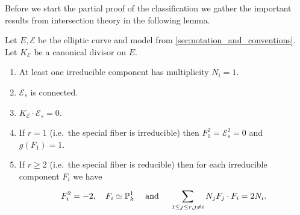 Before we start the partial proof of the classification we gather the important results from intersection theory in the following lemma. 
\begin{lemma}
	\label{prop:irred_comp_of_prop_model}
	Let $E, \mathscr E$ be the elliptic curve and model from \cref{sec:notation_and_conventions}. 
	Let $K_{\mathscr E}$ be a canonical divisor on $E$. 
	\begin{enumerate}
		\item At least one irreducible component has multiplicity $N_i = 1$.  
		\item $\mathscr E_s$ is connected. 
		\item $K_{\mathscr E} \cdot \mathscr E_s = 0 $. 
		\item If $r = 1$ (i.e.\ the special fiber is irreducible) then $F_1^2 = \mathscr{E} _s^2 = 0$ and $g (F_1) = 1$. 
		\item If $r \ge 2$ (i.e.\ the special fiber is reducible) then for each irreducible component $F_i$ we have \[
		F_i^2 = -2,\quad  F_i \simeq \mathbb{P}^{1}_k \quad \text{ and }\quad \sum_{1 \le j \le r, j \ne i}^{} N_j F_j\cdot  F_i = 2 N_i
		.\]   
	\end{enumerate}
\end{lemma}
